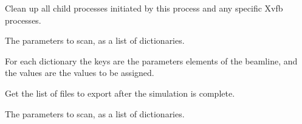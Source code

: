 \documentclass[letterpaper,10pt,english]{sphinxmanual}
\begin{document}
\begin{fulllineitems}
\begin{fulllineitems}
\label{\detokenize{API:raypyng.simulate.Simulate.cleanup_child_processes}}
\pysigstartsignatures
\pysiglinewithargsret
{}
{}
{}
\pysigstopsignatures
\sphinxAtStartPar
Clean up all child processes initiated by this process
and any specific Xvfb processes.

\end{fulllineitems}


\begin{fulllineitems}
\label{\detokenize{API:raypyng.simulate.Simulate.efficiency}}
\pysigstartsignatures
\pysigline
{}
\pysigstopsignatures
\sphinxAtStartPar
The parameters to scan, as a list of dictionaries.

\sphinxAtStartPar
For each dictionary the keys are the parameters elements
of the beamline, and the values are the
values to be assigned.

\end{fulllineitems}


\begin{fulllineitems}
\label{\detokenize{API:raypyng.simulate.Simulate.exports}}
\pysigstartsignatures
\pysigline
{}
\pysigstopsignatures
\sphinxAtStartPar
Get the list of files to export after the simulation is complete.

\end{fulllineitems}


\begin{fulllineitems}
\label{\detokenize{API:raypyng.simulate.Simulate.params}}
\pysigstartsignatures
\pysigline
{}
\pysigstopsignatures
\sphinxAtStartPar
The parameters to scan, as a list of dictionaries.


\end{fulllineitems}
\end{fulllineitems}
\end{document}
